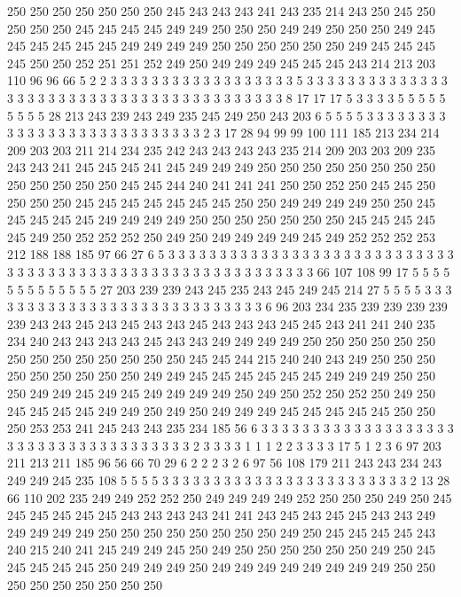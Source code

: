 250 250 250 250 250 250 250 245 243 243 243 241 243 235 214 243 250 245 250 250
250 250 245 245 245 245 249 249 250 250 250 249 249 250 250 250 249 245 245 245
245 245 245 249 249 249 249 250 250 250 250 250 250 249 245 245 245 245 250 250
252 251 251 252 249 250 249 249 249 245 245 245 243 214 213 203 110 96 96 66
5 2 2 3 3 3 3 3 3 3 3 3 3 3 3 3 3 3 3 3
3 5 3 3 3 3 3 3 3 3 3 3 3 3 3 3 3 3 3 3
3 3 3 3 3 3 3 3 3 3 3 3 3 3 3 3 3 3 3 3
3 3 3 8 17 17 17 5 3 3 3 3 5 5 5 5 5 5 5 5
5 28 213 243 239 243 249 235 245 249 250 243 203 6 5 5 5 5 3 3
3 3 3 3 3 3 3 3 3 3 3 3 3 3 3 3 3 3 3 3
3 3 3 3 3 2 3 17 28 94 99 99 100 111 185 213 234 214 209 203
203 211 214 234 235 242 243 243 243 243 235 214 209 203 203 209 235 243 243 241
245 245 245 241 245 249 249 249 250 250 250 250 250 250 250 250 250 250 250 250
250 245 245 244 240 241 241 241 250 250 252 250 245 245 250 250 250 250 245 245
245 245 245 245 245 250 250 249 249 249 249 250 250 245 245 245 245 245 249 249
249 249 250 250 250 250 250 250 250 245 245 245 245 245 249 250 252 252 252 250
249 250 249 249 249 249 245 249 252 252 252 253 212 188 188 185 97 66 27 6
5 3 3 3 3 3 3 3 3 3 3 3 3 3 3 3 3 3 3 3
3 3 3 3 3 3 3 3 3 3 3 3 3 3 3 3 3 3 3 3
3 3 3 3 3 3 3 3 3 3 3 3 3 3 3 3 3 3 3 66
107 108 99 17 5 5 5 5 5 5 5 5 5 5 5 5 5 27 203 239
239 243 245 235 243 245 249 245 214 27 5 5 5 5 3 3 3 3 3 3
3 3 3 3 3 3 3 3 3 3 3 3 3 3 3 3 3 3 3 3
3 3 6 96 203 234 235 239 239 239 239 239 243 243 245 243 245 243 243 245
243 243 243 245 245 243 241 241 240 235 234 240 243 243 243 243 245 243 243 249
249 249 249 250 250 250 250 250 250 250 250 250 250 250 250 250 250 245 245 244
215 240 240 243 249 250 250 250 250 250 250 250 250 250 249 249 245 245 245 245
245 245 249 249 249 250 250 250 249 249 245 249 245 249 249 249 249 250 249 250
252 250 252 250 249 250 245 245 245 245 249 249 250 249 250 249 249 249 245 245
245 245 245 250 250 250 253 253 241 245 243 243 235 234 185 56 6 3 3 3
3 3 3 3 3 3 3 3 3 3 3 3 3 3 3 3 3 3 3 3
3 3 3 3 3 3 3 3 3 3 3 3 3 3 2 3 3 3 3 1
1 1 2 2 3 3 3 3 17 5 1 2 3 6 97 203 211 213 211 185
96 56 66 70 29 6 2 2 2 3 2 6 97 56 108 179 211 243 243 234
243 249 249 245 235 108 5 5 5 5 3 3 3 3 3 3 3 3 3 3
3 3 3 3 3 3 3 3 3 3 3 3 3 3 2 13 28 66 110 202
235 249 249 252 252 250 249 249 249 249 252 250 250 250 249 250 245 245 245 245
245 245 243 243 243 243 241 241 243 245 243 245 245 243 243 249 249 249 249 249
250 250 250 250 250 250 250 250 249 250 245 245 245 245 243 240 215 240 241 245
249 249 245 250 249 250 250 250 250 250 250 249 250 245 245 245 245 245 250 249
249 249 250 249 249 249 249 249 249 249 249 250 250 250 250 250 250 250 250 250
